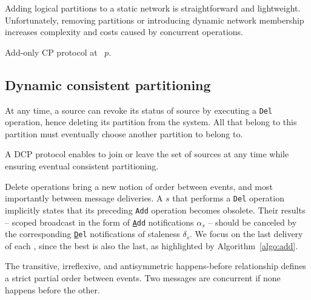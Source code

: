 Adding logical partitions to a static network is straightforward and
lightweight. Unfortunately, removing partitions or introducing dynamic
network membership increases complexity and costs caused by concurrent
operations.

\begin{algorithm}[t]
  
  \caption{\label{algo:add}Add-only CP protocol at \Process~$p$.}
\end{algorithm}

\subsection{Dynamic consistent partitioning}
\label{subsec:dynamic}

At any time, a source can revoke its status of source by executing a
\texttt{Del} operation, hence deleting its partition from the
system. All \processes that belong to this partition must eventually
choose another partition to belong to.


\begin{definition} A DCP
  protocol enables \processes to join or leave the set of sources at
  any time while ensuring eventual consistent partitioning.
\end{definition}

Delete operations bring a new notion of order between events, and most
importantly between message deliveries. A \process $s$ that performs a
\texttt{Del} operation implicitly states that its preceding
\texttt{Add} operation becomes obsolete. %
Their results
-- scoped broadcast in the form of \texttt{\underline{A}dd}
notifications $\alpha_s$ -- should be canceled by the corresponding
\texttt{\underline{D}el} notifications of staleness $\delta_s$. We
focus on the last delivery of each \process, since the best is also
the last, as highlighted by Algorithm~\ref{algo:add}.


\begin{definition}
  The transitive, irreflexive, and antisymmetric happens-before
  relationship defines a strict partial order between events.  Two
  messages are concurrent if none happens before the other.
\end{definition}

